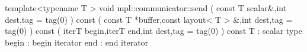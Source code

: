 template<typename T >
void mpl::communicator::send
   ( const T scalar&,int dest,tag = tag(0) ) const
   ( const T *buffer,const layout< T > &,int dest,tag = tag(0) ) const
   ( iterT begin,iterT end,int dest,tag = tag(0) ) const
T : scalar type
begin : begin iterator
end : end iterator
